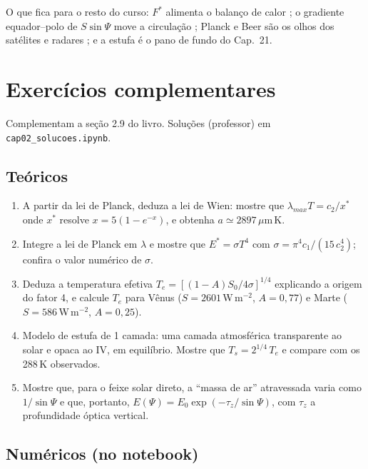 \documentclass[11pt]{article}
\begin{document}
O que fica para o resto do curso: $F^*$ alimenta o balanço de calor
; o gradiente equador--polo de
$S\sin\Psi$ move a circulação ; Planck e
Beer são os olhos dos satélites e radares ; e a estufa é o pano de fundo do Cap.~21.

\section{Exercícios complementares}\label{sec:exercicios}

Complementam a seção 2.9 do livro. Soluções (professor) em
\texttt{cap02\_solucoes.ipynb}.

\subsection*{Teóricos}

\begin{enumerate}[label=\textbf{T\arabic*.},itemsep=4pt]
  \item A partir da lei de Planck, deduza a lei de Wien: mostre que
        $\lambda_{max}T = c_2/x^*$ onde $x^*$ resolve $x = 5(1-e^{-x})$, e
        obtenha $a \simeq 2897\,\mu$m\,K.
  \item Integre a lei de Planck em $\lambda$ e mostre que
        $E^* = \sigma T^4$ com $\sigma = \pi^4 c_1/(15\,c_2^4)$; confira o
        valor numérico de $\sigma$.
  \item Deduza a temperatura efetiva $T_e = [(1-A)S_0/4\sigma]^{1/4}$
        explicando a origem do fator 4, e calcule $T_e$ para Vênus
        ($S = 2601$\,W\,m$^{-2}$, $A = 0{,}77$) e Marte
        ($S = 586$\,W\,m$^{-2}$, $A = 0{,}25$).
  \item Modelo de estufa de 1 camada: uma camada atmosférica transparente
        ao solar e opaca ao IV, em equilíbrio. Mostre que
        $T_s = 2^{1/4}\,T_e$ e compare com os 288\,K observados.
  \item Mostre que, para o feixe solar direto, a ``massa de ar''
        atravessada varia como $1/\sin\Psi$ e que, portanto,
        $E(\Psi) = E_0\exp(-\tau_z/\sin\Psi)$, com $\tau_z$ a profundidade
        óptica vertical.
\end{enumerate}

\subsection*{Numéricos (no notebook)}
\end{document}
